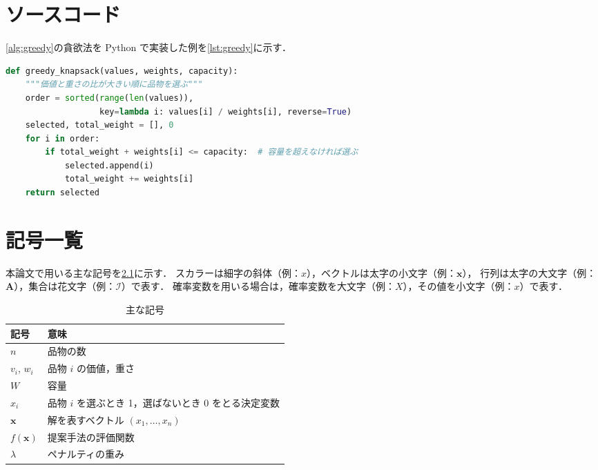 \chapter{ソースコード}
\label{chap:source-code}

\cref{alg:greedy}の貪欲法を Python で実装した例を\cref{lst:greedy}に示す．

\begin{lstlisting}[language=Python, caption={貪欲法の実装例}, label=lst:greedy]
def greedy_knapsack(values, weights, capacity):
    """価値と重さの比が大きい順に品物を選ぶ"""
    order = sorted(range(len(values)),
                   key=lambda i: values[i] / weights[i], reverse=True)
    selected, total_weight = [], 0
    for i in order:
        if total_weight + weights[i] <= capacity:  # 容量を超えなければ選ぶ
            selected.append(i)
            total_weight += weights[i]
    return selected
\end{lstlisting}

\chapter{記号一覧}
\label{chap:notation}

本論文で用いる主な記号を\cref{tab:notation}に示す．
スカラーは細字の斜体（例：$x$），ベクトルは太字の小文字（例：$\mathbf{x}$），
行列は太字の大文字（例：$\mathbf{A}$），集合は花文字（例：$\mathcal{I}$）で表す．
確率変数を用いる場合は，確率変数を大文字（例：$X$），その値を小文字（例：$x$）で表す．

\begin{table}[htbp]
  \centering
  \caption{主な記号}
  \label{tab:notation}
  \begin{tabular}{ll}
    \toprule
    記号 & 意味 \\
    \midrule
    $n$ & 品物の数 \\
    $v_i$, $w_i$ & 品物 $i$ の価値，重さ \\
    $W$ & 容量 \\
    $x_i$ & 品物 $i$ を選ぶとき 1，選ばないとき 0 をとる決定変数 \\
    $\mathbf{x}$ & 解を表すベクトル $(x_1, \dots, x_n)$ \\
    $f(\mathbf{x})$ & 提案手法の評価関数 \\
    $\lambda$ & ペナルティの重み \\
    \bottomrule
  \end{tabular}
\end{table}
